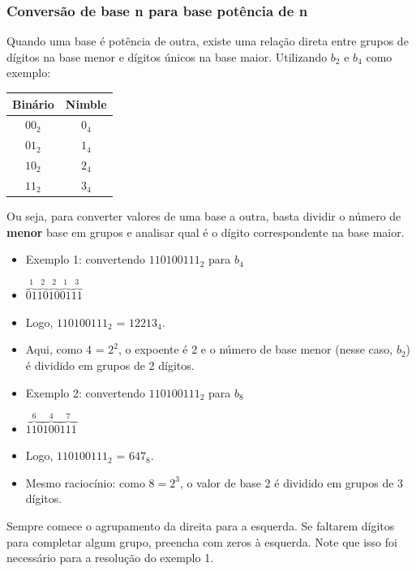 \documentclass[12pt]{article}
\begin{document}
\subsubsection{Conversão de base n para base potência de n}
Quando uma base é potência de outra, existe uma relação direta entre grupos de dígitos na base menor e dígitos únicos na base maior. Utilizando $b_{2}$ e $b_{4}$ como exemplo:
\begin{center}
\begin{tabular}{|c|c|}
\hline
\textbf{Binário} & \textbf{Nimble} \\
\hline
$00_{2}$ & $0_{4}$ \\
\hline
$01_{2}$ & $1_{4}$ \\
\hline
$10_{2}$ & $2_{4}$ \\
\hline
$11_{2}$ & $3_{4}$ \\
\hline
\end{tabular}
\end{center}
Ou seja, para converter valores de uma base a outra, basta dividir o número de \textbf{menor} base em grupos e analisar qual é o dígito correspondente na base maior.
\begin{itemize}
    \item Exemplo 1: convertendo $110100111_{2}$ para $b_{4}$
    \item [""] $\overset{1}{\overbrace{01}}\overset{2}{\overbrace{10}}\overset{2}{\overbrace{10}}\overset{1}{\overbrace{01}}\overset{3}{\overbrace{11}}$
    \item [""] Logo, $110100111_{2}$ = $12213_{4}$.
    \item [""] Aqui, como 4 = $2^2$, o expoente é 2 e o número de base menor (nesse caso, $b_{2}$) é dividido em grupos de 2 dígitos.
    \item Exemplo 2: convertendo $110100111_{2}$ para $b_{8}$
    \item [""] $\overset{6}{\overbrace{110}}\overset{4}{\overbrace{100}}\overset{7}{\overbrace{111}}$
    \item [""] Logo, $110100111_{2}$ = $647_{8}$.
    \item [""] Mesmo raciocínio: como $8 = 2^{3}$, o valor de base 2 é dividido em grupos de 3 dígitos.
\end{itemize}
\begin{tcolorbox}[mynote, title= Observação]
Sempre comece o agrupamento da direita para a esquerda. Se faltarem dígitos para completar algum grupo, preencha com zeros à esquerda. Note que isso foi necessário para a resolução do exemplo 1.
\end{tcolorbox}
\end{document}
